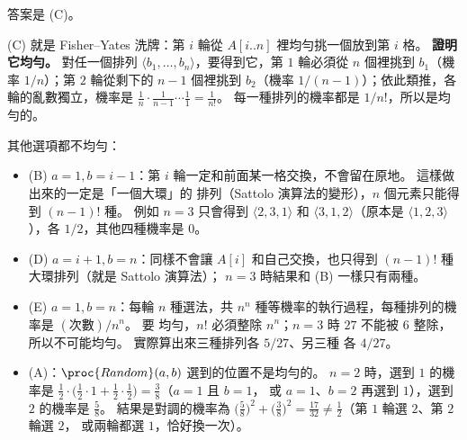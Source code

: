 \begin{pastsoln}
答案是 (C)。

(C) 就是 Fisher--Yates 洗牌：第 $i$ 輪從 $A[i..n]$ 裡均勻挑一個放到第 $i$ 格。 \textbf{證明它均勻。} 對任一個排列
$\langle b_1, \ldots, b_n \rangle$，要得到它，第 $1$ 輪必須從 $n$ 個裡挑到 $b_1$（機率 $1/n$）；第 $2$ 輪從剩下的
$n - 1$ 個裡挑到 $b_2$（機率 $1/(n-1)$）；依此類推，各輪的亂數獨立，機率是
$\frac{1}{n} \cdot \frac{1}{n-1} \cdots \frac{1}{1} = \frac{1}{n!}$。 每一種排列的機率都是 $1/n!$，所以是均勻的。

其他選項都不均勻：
\begin{itemize}
\item (B) $a = 1, b = i - 1$：第 $i$ 輪一定和前面某一格交換，不會留在原地。 這樣做出來的一定是「一個大環」的
排列（Sattolo 演算法的變形），$n$ 個元素只能得到 $(n-1)!$ 種。 例如 $n = 3$ 只會得到 $\langle 2, 3, 1\rangle$ 和
$\langle 3, 1, 2\rangle$（原本是 $\langle 1, 2, 3\rangle$），各 $1/2$，其他四種機率是 $0$。
\item (D) $a = i + 1, b = n$：同樣不會讓 $A[i]$ 和自己交換，也只得到 $(n-1)!$ 種大環排列（就是 Sattolo 演算法）；
$n = 3$ 時結果和 (B) 一樣只有兩種。
\item (E) $a = 1, b = n$：每輪 $n$ 種選法，共 $n^n$ 種等機率的執行過程，每種排列的機率是 $(\text{次數})/n^n$。 要
均勻，$n!$ 必須整除 $n^n$；$n = 3$ 時 $27$ 不能被 $6$ 整除，所以不可能均勻。 實際算出來三種排列各 $5/27$、另三種
各 $4/27$。
\item (A)：$\proc{Random}(a, b)$ 選到的位置不是均勻的。 $n = 2$ 時，選到 $1$ 的機率是
$\frac{1}{2} \cdot \bigl(\frac{1}{2} \cdot 1 + \frac{1}{2} \cdot \frac{1}{2}\bigr) = \frac{3}{8}$（$a = 1$ 且 $b = 1$，
或 $a = 1$、$b = 2$ 再選到 $1$），選到 $2$ 的機率是 $\frac{5}{8}$。 結果是對調的機率為
$\bigl(\frac{5}{8}\bigr)^2 + \bigl(\frac{3}{8}\bigr)^2 = \frac{17}{32} \ne \frac{1}{2}$（第 $1$ 輪選 $2$、第 $2$ 輪選 $2$，
或兩輪都選 $1$，恰好換一次）。
\end{itemize}
\end{pastsoln}
